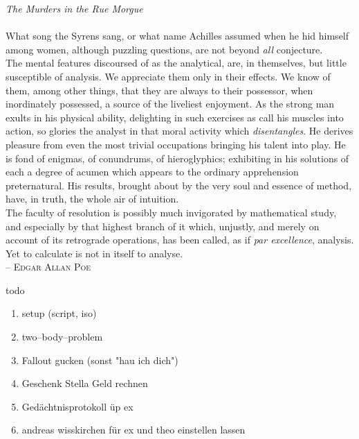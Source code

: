 \documentclass{article}
\begin{document}
\Huge
\textit{The Murders in the Rue Morgue}\\\\
What song the Syrens sang, or what name Achilles assumed when he hid himself among women, although puzzling questions, are not beyond \textit{all} conjecture.\\\indent
The mental features discoursed of as the analytical, are, in themselves, but little susceptible of analysis. 
We appreciate them only in their effects. 
We know of them, among other things, that they are always to their possessor, when inordinately possessed, a source of the liveliest enjoyment.
As the strong man exults in his physical ability, delighting in such exercises as call his muscles into action, so glories the analyst in that moral activity which \textit{disentangles}.
He derives pleasure from even the most trivial occupations bringing his talent into play.
He is fond of enigmas, of conundrums, of hieroglyphics; exhibiting in his solutions of each a degree of acumen which appears to the ordinary apprehension preternatural.
His results, brought about by the very soul and essence of method, have, in truth, the whole air of intuition.\\\indent
The faculty of resolution is possibly much invigorated by mathematical study, and especially by that highest branch of it which, unjustly, and merely on account of its retrograde operations, has been called, as if \textit{par excellence}, analysis. 
Yet to calculate is not in itself to analyse.\\
\null\hfill -- \textsc{Edgar Allan Poe}


\color{fg}

\vfill

\noindent todo
\begin{enumerate}[label=--]
        \item setup (script, iso)
        \item two--body--problem
        \item Fallout gucken (sonst "hau ich dich")
        \item Geschenk Stella Geld rechnen
        \item Gedächtnisprotokoll üp ex
        \item andreas wisskirchen für ex und theo einstellen lassen
\end{enumerate}
\end{document}
